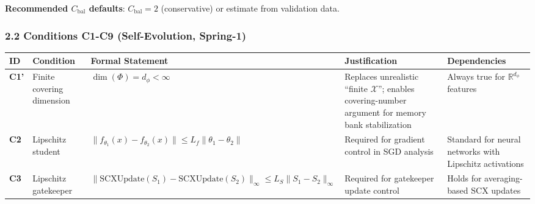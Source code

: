 \documentclass[
  12pt,
]{ctexart}
\begin{document}
\textbf{Recommended \(C_{\text{bal}}\) defaults}: \(C_{\text{bal}} = 2\)
(conservative) or estimate from validation data.

\subsubsection{2.2 Conditions C1-C9 (Self-Evolution,
Spring-1)}\label{conditions-c1-c9-self-evolution-spring-1}

\begin{longtable}[]{@{}
  >{\raggedright\arraybackslash}p{}
  >{\raggedright\arraybackslash}p{}
  >{\raggedright\arraybackslash}p{}
  >{\raggedright\arraybackslash}p{}
  >{\raggedright\arraybackslash}p{}@{}}
\toprule\noalign{}
\begin{minipage}[b]{\linewidth}\raggedright
ID
\end{minipage} & \begin{minipage}[b]{\linewidth}\raggedright
Condition
\end{minipage} & \begin{minipage}[b]{\linewidth}\raggedright
Formal Statement
\end{minipage} & \begin{minipage}[b]{\linewidth}\raggedright
Justification
\end{minipage} & \begin{minipage}[b]{\linewidth}\raggedright
Dependencies
\end{minipage} \\
\midrule\noalign{}
\endhead
\bottomrule\noalign{}
\endlastfoot
\textbf{C1'} & Finite covering dimension &
\(\dim(\Phi) = d_\phi < \infty\) & Replaces unrealistic ``finite
\(\mathcal{X}\)''; enables covering-number argument for memory bank
stabilization & Always true for \(\mathbb{R}^{d_\phi}\) features \\
\textbf{C2} & Lipschitz student &
\(\|f_{\theta_1}(x) - f_{\theta_2}(x)\| \leq L_f\|\theta_1-\theta_2\|\)
& Required for gradient control in SGD analysis & Standard for neural
networks with Lipschitz activations \\
\textbf{C3} & Lipschitz gatekeeper &
\(\|\text{SCXUpdate}(S_1) - \text{SCXUpdate}(S_2)\|_\infty \leq L_S\|S_1-S_2\|_\infty\)
& Required for gatekeeper update control & Holds for averaging-based SCX
updates \\

\end{longtable}
\end{document}
